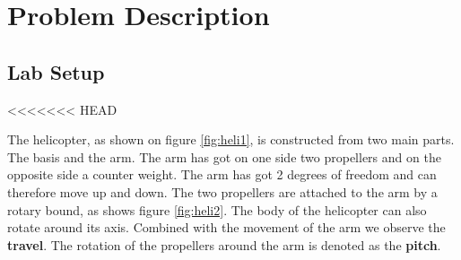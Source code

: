 \section{Problem Description}\label{sec:prob_descr}
\subsection{Lab Setup}
<<<<<<< HEAD

The helicopter, as shown on figure \ref{fig:heli1}, is constructed from two main parts. The basis and the arm. The arm has got on one side two propellers and on the opposite side a counter weight. The arm has got 2 degrees of freedom and can therefore move up and down. The two propellers are attached to the arm by a rotary bound, as shows figure \ref{fig:heli2}. 
The body of the helicopter can also rotate around its axis. Combined with the movement of the arm we observe the \textbf{travel}. The rotation of the propellers around the arm is denoted as the \textbf{pitch}. 	

